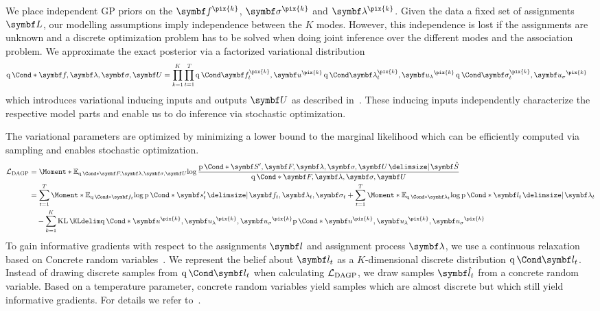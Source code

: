 We place independent GP priors on the $\mat{f}^{\pix{k}}$, $\mat{\sigma}^{\pix{k}}$ and $\mat{\lambda}^{\pix{k}}$.
Given the data a fixed set of assignments $\mat{L}$, our modelling assumptions imply independence between the $K$ modes.
However, this independence is lost if the assignments are unknown and a discrete optimization problem has to be solved when doing joint inference over the different modes and the association problem.
We approximate the exact posterior via a factorized variational distribution
\begin{align}
    \Variat*{\mat{f}, \mat{\lambda}, \mat{\sigma}, \mat{U}} & =
    \prod_{k=1}^K\prod_{t=1}^T \Variat{\mat{f}_t^{\pix{k}}, \mat{u}^{\pix{k}}} \Variat{\mat{\lambda}_t^{\pix{k}}, \mat{u_\lambda}^{\pix{k}}} \Variat{\mat{\sigma}_t^{\pix{k}}, \mat{u_\sigma}^{\pix{k}}}
\end{align}
which introduces variational inducing inputs and outputs $\mat{U}$ as described in~\parencite{damianou_deep_2013,hensman_scalable_2015,kaiser_data_2018}.
These inducing inputs independently characterize the respective model parts and enable us to do inference via stochastic optimization.

The variational parameters are optimized by minimizing a lower bound to the marginal likelihood which can be efficiently computed via sampling and enables stochastic optimization.
\begin{align}
    \begin{split}
        \label{eq:interpretable_rl:variational_bound}
        \Lc_{\text{DAGP}} &= \Moment*{\E_{\Variat*{\mat{F}, \mat{\lambda}, \mat{\sigma}, \mat{U}}}}{\log\frac{\Prob*{\mat{S}^\prime, \mat{F}, \mat{\lambda}, \mat{\sigma}, \mat{U} \given \mat{\hat{S}}}}{\Variat*{\mat{F}, \mat{\lambda}, \mat{\sigma}, \mat{U}}}} \\
        &=
        \sum_{t=1}^T \Moment*{\E_{\Variat*{\mat{f}_t}}}{\log \Prob*{\mat{s}^\prime_t \given \mat{f}_t, \mat{\lambda}_t, \mat{\sigma}_t}}
        + \sum_{t=1}^T \Moment*{\E_{\Variat*{\mat{\lambda}_t}}}{\log \Prob*{\mat{l}_t \given \mat{\lambda}_t}} \\
        &\quad
        - \sum_{k=1}^K \KL{\Variat*{\mat{u}^{\pix{k}}, \mat{u_\lambda}^{\pix{k}}, \mat{u_\sigma}^{\pix{k}}}}{\Prob*{\mat{u}^{\pix{k}}, \mat{u_\lambda}^{\pix{k}}, \mat{u_\sigma}^{\pix{k}}}}
    \end{split}
\end{align}
To gain informative gradients with respect to the assignments $\mat{l}$ and assignment process $\mat{\lambda}$, we use a continuous relaxation based on Concrete random variables~\parencite{maddison_concrete_2016}.
We represent the belief about $\mat{l}_t$ as a $K$-dimensional discrete distribution $\Variat{\mat{l}_t}$.
Instead of drawing discrete samples from $\Variat{\mat{l}_t}$ when calculating $\mathcal{L}_{\text{DAGP}}$, we draw samples $\mat{\hat{l}}_t$ from a concrete random variable.
Based on a temperature parameter, concrete random variables yield samples which are almost discrete but which still yield informative gradients.
For details we refer to~\parencite{kaiser_data_2018}.

